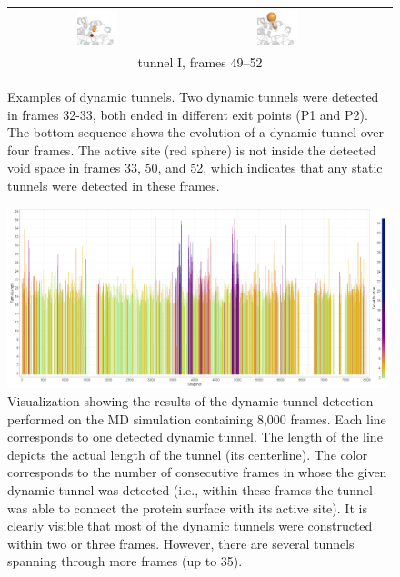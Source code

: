 \documentclass[usletter, 10pt, conference]{svjour3}      %
\begin{document}
\begin{figure}
{\begin{tabular}{cccc}
\includegraphics[width=0.24\textwidth]{fig/framed-0053-000-0051} &
\includegraphics[width=0.24\textwidth]{fig/framed-0053-000-0053} \\
\multicolumn{4}{c}{tunnel I, frames 49--52} \\
\end{tabular}
\caption{\label{fig::seq1}
Examples of dynamic tunnels.
Two dynamic tunnels were detected in frames 32-33, both ended in different exit points (P1 and P2).
The bottom sequence shows the evolution of a dynamic tunnel over four frames.
The active site (red sphere) is not inside the detected void space in frames 33, 50, and 52, which indicates that any static tunnels
were detected in these frames.
}
}
\end{figure}



\begin{figure}
\centering
\includegraphics[width=0.99\textwidth]{fig/5}
\caption{\label{fig::vis1}
Visualization showing the results of the dynamic tunnel detection performed on the MD simulation containing 8,000 frames. 
  Each line corresponds to one detected dynamic tunnel.
  The length of the line depicts the actual length of the tunnel (its centerline). 
  The color corresponds to the number of consecutive frames in whose the given dynamic tunnel was detected (i.e., within these frames the tunnel was able to connect the protein surface with its active site).
    It is clearly visible that most of the dynamic tunnels were constructed within two or three frames. However, there are several tunnels spanning through more frames (up to 35).
}
\end{figure}
\end{document}
